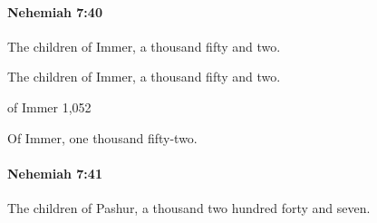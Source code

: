 		\paragraph{Nehemiah 7:40} %
			\label{NEHEMIAH-7-40}

			The children of Immer, a thousand fifty and two.

			\begin{versebox}
					\item[BHS] 
					\item[LXX] 
					\item[ASV] The children of Immer, a thousand fifty and two.
					\item[NIV] of Immer 1,052
					\item[NRSV] Of Immer, one thousand fifty-two.
			\end{versebox}

		\paragraph{Nehemiah 7:41} %
			\label{NEHEMIAH-7-41}

			The children of Pashur, a thousand two hundred forty and seven.

